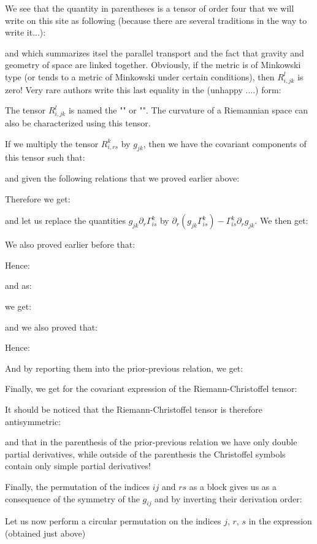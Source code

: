 	We see that the quantity in parentheses is a tensor of order four that we will write on this site as following (because there are several traditions in the way to write it...):
	
	and which summarizes itsel the parallel transport and the fact that gravity and geometry of space are linked together. Obviously, if the metric is of Minkowski type (or tends to a metric of Minkowski under certain conditions), then $R_{i,jk}^l$ is zero! Very rare authors write this last equality in the (unhappy ....) form:
	
	The tensor $R_{i,jk}^l$ is named the "" or "". The curvature of a Riemannian space can also be characterized using this tensor.

	If we multiply the tensor $R_{i,rs}^k$ by $g_{jk}$, then we have the covariant components of this tensor such that:
	
	and given the following relations that we proved earlier above:
	
	Therefore we get:
	
	and let us replace the quantities $g_{jk}\partial_r\Gamma_{is}^k$ by $\partial_r\left(g_{jk}\Gamma_{is}^k\right)-\Gamma_{is}^k\partial_r g_{jk}$. We then get:
	
	We also proved earlier before that:
	
	Hence:
	
	and as:
	
	we get:
	
	and we also proved that:
	
	Hence:
	
	And by reporting them into the prior-previous relation, we get:
	
	Finally, we get for the covariant expression of the Riemann-Christoffel tensor:
	
	It should be noticed that the Riemann-Christoffel tensor is therefore antisymmetric:
	
	and that in the parenthesis of the prior-previous relation we have only double partial derivatives, while outside of the parenthesis the Christoffel symbols contain only simple partial derivatives!

	Finally, the permutation of the indices $ij$ and $rs$ as a block gives us as a consequence of the symmetry of the $g_{ij}$ and by inverting their derivation order:
	
	Let us now perform a circular permutation on the indices $j$, $r$, $s$ in the expression (obtained just above)
	
